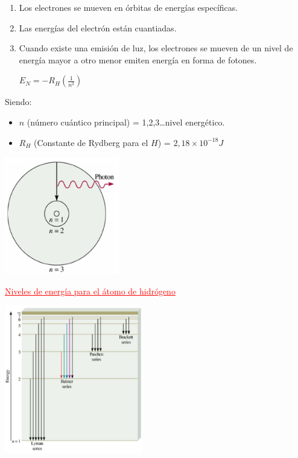         \begin{enumerate}
            \item Los electrones se mueven en órbitas de energías específicas.
            \item Las energías del electrón están cuantiadas.
            \item Cuando existe una emisión de luz, los electrones se mueven de un nivel de energía mayor a otro menor emiten energía en forma de fotones.
            \begin{center} 
                $E_N = - R_H (\frac{1}{n^2})$
            \end{center}
        \end{enumerate}
        \saltoPag%
        \indent Siendo:
        \begin{itemize}
            \item $n$ (número cuántico principal) = 1,2,3\dots nivel energético.
            \item $R_H$ (Constante de Rydberg para el $H$) = $2,18 \times 10^{-18}J$
        \end{itemize}
        \begin{center} \includegraphics[width=5cm]{./imagenes/nivelesDeEnergia.png} \end{center}
        \begin{center} \textcolor{red}{\underline{Niveles de energía para el átomo de hidrógeno}} \end{center}
            \begin{center} \includegraphics[width=6cm]{./imagenes/nivelesDeEnergia2.png} \end{center}

